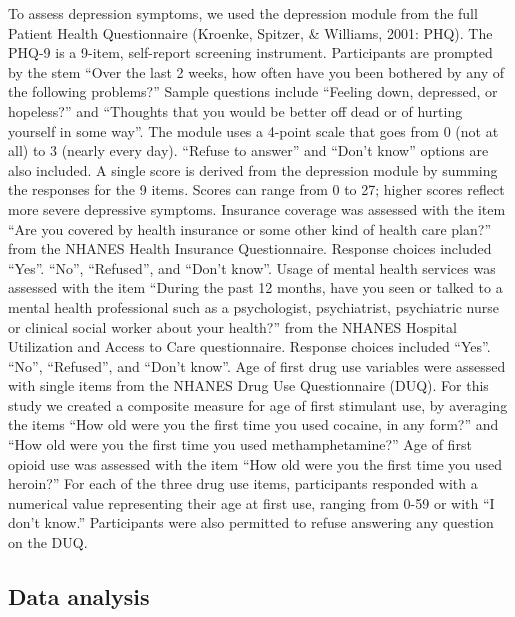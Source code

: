 \documentclass[man]{apa6}
\begin{document}
To assess depression symptoms, we used the depression module from the
full Patient Health Questionnaire (Kroenke, Spitzer, \& Williams, 2001:
PHQ). The PHQ-9 is a 9-item, self-report screening instrument.
Participants are prompted by the stem \enquote{Over the last 2 weeks,
how often have you been bothered by any of the following problems?}
Sample questions include \enquote{Feeling down, depressed, or hopeless?}
and \enquote{Thoughts that you would be better off dead or of hurting
yourself in some way}. The module uses a 4-point scale that goes from 0
(not at all) to 3 (nearly every day). \enquote{Refuse to answer} and
\enquote{Don't know} options are also included. A single score is
derived from the depression module by summing the responses for the 9
items. Scores can range from 0 to 27; higher scores reflect more severe
depressive symptoms. Insurance coverage was assessed with the item
\enquote{Are you covered by health insurance or some other kind of
health care plan?} from the NHANES Health Insurance Questionnaire.
Response choices included \enquote{Yes}. \enquote{No},
\enquote{Refused}, and \enquote{Don't know}. Usage of mental health
services was assessed with the item \enquote{During the past 12 months,
have you seen or talked to a mental health professional such as a
psychologist, psychiatrist, psychiatric nurse or clinical social worker
about your health?} from the NHANES Hospital Utilization and Access to
Care questionnaire. Response choices included \enquote{Yes}.
\enquote{No}, \enquote{Refused}, and \enquote{Don't know}. Age of first
drug use variables were assessed with single items from the NHANES Drug
Use Questionnaire (DUQ). For this study we created a composite measure
for age of first stimulant use, by averaging the items \enquote{How old
were you the first time you used cocaine, in any form?} and \enquote{How
old were you the first time you used methamphetamine?} Age of first
opioid use was assessed with the item \enquote{How old were you the
first time you used heroin?} For each of the three drug use items,
participants responded with a numerical value representing their age at
first use, ranging from 0-59 or with \enquote{I don't know.}
Participants were also permitted to refuse answering any question on the
DUQ.

\subsection{Data analysis}\label{data-analysis}
\end{document}
